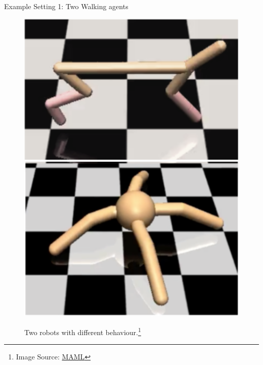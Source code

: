 \begin{frame}[c]{Example Setting 1: Two Walking agents}

\begin{figure}
\centering
\includegraphics[scale=0.5]{images/cheetah}
\includegraphics[scale=0.5]{images/ant}
\caption{Two robots with different behaviour.\footnote{Image Source: \href{https://arxiv.org/pdf/1703.03400.pdf}{MAML}}}
\end{figure}

\end{frame}

